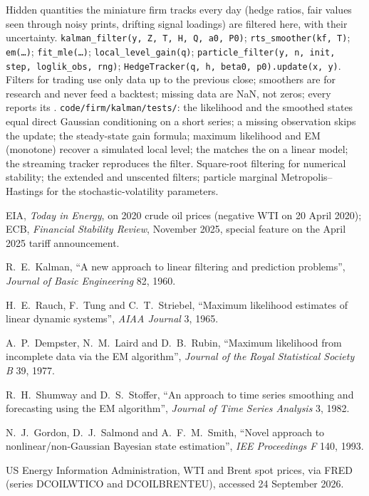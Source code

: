 \begin{build}
 Hidden quantities the miniature firm tracks every day (hedge ratios, fair values seen through noisy prints, drifting signal loadings) are
filtered here, with their uncertainty.
 \texttt{kalman\_filter(y, Z, T, H, Q, a0, P0)}; \texttt{rts\_smoother(kf, T)}; \texttt{em(\dots)}; \texttt{fit\_mle(\dots)};
\texttt{local\_level\_gain(q)}; \texttt{particle\_filter(y, n, init, step, loglik\_obs, rng)}; \texttt{HedgeTracker(q, h, beta0, p0).update(x, y)}.
 Filters for trading use only data up to the previous close; smoothers are for research and never feed a backtest; missing data are NaN, not zeros;
every  reports its .
 \texttt{code/firm/kalman/tests/}: the likelihood and the smoothed states equal direct Gaussian conditioning on a short series; a missing
observation skips the update; the steady-state gain formula; maximum likelihood and EM (monotone) recover a simulated local level; the 
matches the  on a linear model; the streaming tracker reproduces the filter.
 Square-root filtering for numerical stability; the extended and unscented filters; particle marginal Metropolis--Hastings for the
stochastic-volatility parameters.
\end{build}

\begin{omsources}
\item EIA, \emph{Today in Energy}, on 2020 crude oil prices (negative WTI on 20 April 2020); ECB, \emph{Financial Stability Review}, November 2025, special feature on the April 2025 tariff announcement.
\item R.~E.~Kalman, ``A new approach to linear filtering and prediction problems'', \emph{Journal of Basic Engineering} 82, 1960.
\item H.~E.~Rauch, F.~Tung and C.~T.~Striebel, ``Maximum likelihood estimates of linear dynamic systems'', \emph{AIAA Journal} 3, 1965.
\item A.~P.~Dempster, N.~M.~Laird and D.~B.~Rubin, ``Maximum likelihood from incomplete data via the EM algorithm'', \emph{Journal of the Royal
Statistical Society B} 39, 1977.
\item R.~H.~Shumway and D.~S.~Stoffer, ``An approach to time series smoothing and forecasting using the EM algorithm'', \emph{Journal of Time Series
Analysis} 3, 1982.
\item N.~J.~Gordon, D.~J.~Salmond and A.~F.~M.~Smith, ``Novel approach to nonlinear/non-Gaussian Bayesian state estimation'', \emph{IEE Proceedings F} 140,
1993.
\item US Energy Information Administration, WTI and Brent spot prices, via FRED (series DCOILWTICO and DCOILBRENTEU), accessed 24 September 2026.
\end{omsources}

